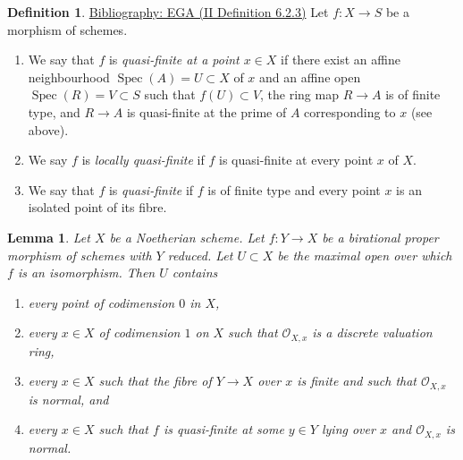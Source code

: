 \documentclass{amsart}
\newenvironment{reference}{\comment}{\endcomment}
\theoremstyle{plain}
\newtheorem{lemma}[subsection]{Lemma}
\theoremstyle{definition}
\newtheorem{definition}[subsection]{Definition}
\theoremstyle{remark}
\numberwithin{equation}{subsection}
\def\Spec{\mathop{\mathrm{Spec}}}
\begin{document}
\begin{definition}
\label{morphisms-definition-quasi-finite}
\begin{reference}
\href{https://stacks.math.columbia.edu/bibliography}{Bibliography: EGA (II Definition 6.2.3)}
\end{reference}
Let $f : X \to S$ be a morphism of schemes.
\begin{enumerate}
\item We say that $f$ is {\it quasi-finite at a point $x \in X$}
if there exist an affine neighbourhood $\Spec(A) = U \subset X$
of $x$ and an affine open $\Spec(R) = V \subset S$ such that
$f(U) \subset V$, the ring map $R \to A$ is of finite type,
and $R \to A$ is quasi-finite at the prime of $A$ corresponding to $x$
(see above).
\item We say $f$ is {\it locally quasi-finite} if $f$ is
quasi-finite at every point $x$ of $X$.
\item We say that $f$ is {\it quasi-finite} if $f$ is of finite type
and every point $x$ is an isolated point of its fibre.
\end{enumerate}
\end{definition}

\begin{lemma}
\label{lemma-modification-normal-iso-over-codimension-1}
Let $X$ be a Noetherian scheme. Let $f : Y \to X$ be a birational proper
morphism of schemes with $Y$ reduced. Let $U \subset X$ be the
maximal open over which $f$ is an isomorphism. Then $U$ contains
\begin{enumerate}
\item every point of codimension $0$ in $X$,
\item every $x \in X$ of codimension $1$ on $X$ such that
$\mathcal{O}_{X, x}$ is a discrete valuation ring,
\item every $x \in X$ such that the fibre of $Y \to X$ over $x$ is
finite and such that $\mathcal{O}_{X, x}$ is normal, and
\item every $x \in X$ such that $f$ is quasi-finite at some
$y \in Y$ lying over $x$ and $\mathcal{O}_{X, x}$ is normal.
\end{enumerate}
\end{lemma}
\end{document}

